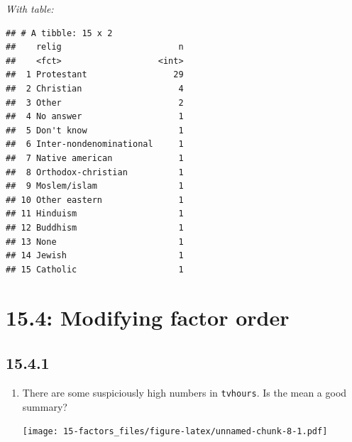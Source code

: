 \documentclass[]{book}
\newenvironment{Shaded}{\begin{snugshade}}{\end{snugshade}}
\newcommand{\DataTypeTok}[1]{\textcolor[rgb]{0.13,0.29,0.53}{#1}}
\newcommand{\KeywordTok}[1]{\textcolor[rgb]{0.13,0.29,0.53}{\textbf{#1}}}
\newcommand{\NormalTok}[1]{#1}
\newcommand{\OperatorTok}[1]{\textcolor[rgb]{0.81,0.36,0.00}{\textbf{#1}}}
\newcommand{\OtherTok}[1]{\textcolor[rgb]{0.56,0.35,0.01}{#1}}
\newcommand{\StringTok}[1]{\textcolor[rgb]{0.31,0.60,0.02}{#1}}
\theoremstyle{definition}
\theoremstyle{definition}
\theoremstyle{definition}
\theoremstyle{remark}
\begin{document}
\begin{enumerate}
  \emph{With table:}

\begin{Shaded}
\end{Shaded}

\begin{verbatim}
## # A tibble: 15 x 2
##    relig                       n
##    <fct>                   <int>
##  1 Protestant                 29
##  2 Christian                   4
##  3 Other                       2
##  4 No answer                   1
##  5 Don't know                  1
##  6 Inter-nondenominational     1
##  7 Native american             1
##  8 Orthodox-christian          1
##  9 Moslem/islam                1
## 10 Other eastern               1
## 11 Hinduism                    1
## 12 Buddhism                    1
## 13 None                        1
## 14 Jewish                      1
## 15 Catholic                    1
\end{verbatim}
\end{enumerate}

\hypertarget{modifying-factor-order-1}{%
\section{15.4: Modifying factor order}\label{modifying-factor-order-1}}

\hypertarget{section-54}{%
\subsection{15.4.1}\label{section-54}}

\begin{enumerate}
\def\labelenumi{\arabic{enumi}.}
\item
  There are some suspiciously high numbers in \texttt{tvhours}. Is the
  mean a good summary?

\begin{Shaded}
\end{Shaded}

  \texttt{[image: 15-factors\_files/figure-latex/unnamed-chunk-8-1.pdf]}
\end{enumerate}
\end{document}
